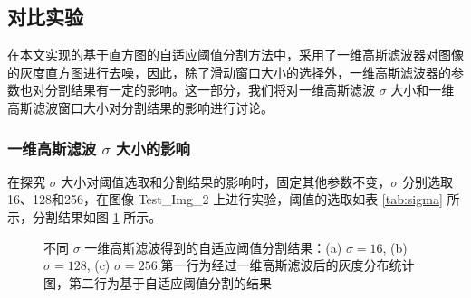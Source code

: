 \subsection{对比实验}

在本文实现的基于直方图的自适应阈值分割方法中，采用了一维高斯滤波器对图像的灰度直方图进行去噪，因此，除了滑动窗口大小的选择外，一维高斯滤波器的参数也对分割结果有一定的影响。这一部分，我们将对一维高斯滤波 $\sigma$ 大小和一维高斯滤波窗口大小对分割结果的影响进行讨论。

\subsubsection{一维高斯滤波 $\sigma$ 大小的影响}

在探究 $\sigma$ 大小对阈值选取和分割结果的影响时，固定其他参数不变，$\sigma$ 分别选取 16、128和256，在图像 Test\_Img\_2 上进行实验，阈值的选取如表 \ref{tab:sigma} 所示，分割结果如图 \ref{fig:sigma_result} 所示。

\begin{table}[!ht]
\vspace{0.03cm}
\caption{不同 $\sigma$ 一维高斯滤波得到的自适应阈值表}
\label{tab:sigma}
\end{table}

\begin{figure}[!ht]
	\vspace{-0.8cm}
  \centering
  \begin{minipage}[b]{\linewidth} 	
  \end{minipage}
  \vfill
  \caption{不同 $\sigma$ 一维高斯滤波得到的自适应阈值分割结果：(a) $\sigma=16$, (b) $\sigma=128$, (c) $\sigma=256$.第一行为经过一维高斯滤波后的灰度分布统计图，第二行为基于自适应阈值分割的结果}
  \label{fig:sigma_result}
\end{figure}

